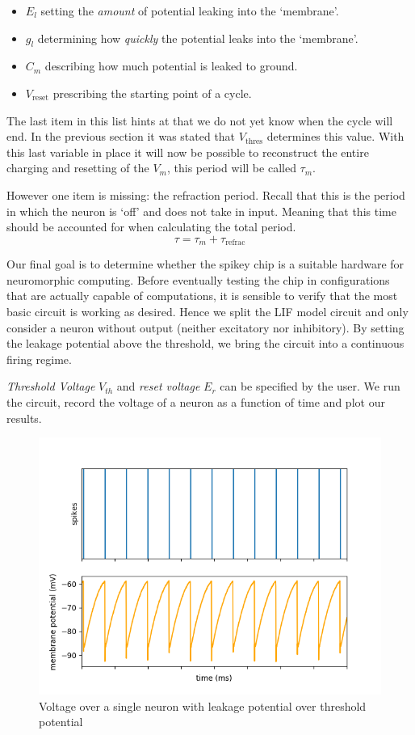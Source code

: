 \documentclass[a4paper,twocolumn]{article}
\begin{document}
\begin{itemize}
    \item $E_l$ setting the \textit{amount} of potential leaking into the `membrane'.
    \item $g_l$ determining how \textit{quickly} the potential leaks into the `membrane'.
    \item $C_m$ describing how much potential is leaked to ground.
    \item $V_\text{reset}$ prescribing the starting point of a cycle.
\end{itemize}

The last item in this list hints at that we do not yet know when the cycle will
end. In the previous section it was stated that $V_\text{thres}$ determines
this value. With this last variable in place it will now be possible to
reconstruct the entire charging and resetting of the $V_m$, this period will be
called $\tau_m$.

However one item is missing: the refraction period. Recall that this is the
period in which the neuron is `off' and does not take in input. Meaning that
this time should be accounted for when calculating the total period.
\begin{equation}
    \tau = \tau_m + \tau_\text{refrac}
    \label{eq:tau}
\end{equation}

Our final goal is to determine whether the spikey chip is a suitable hardware for
neuromorphic computing.  Before eventually testing the chip in configurations
that are actually capable of computations,  it is sensible to verify that the
most basic circuit is working as desired.  Hence we split the LIF model circuit
and only consider a neuron without output (neither excitatory nor inhibitory).
By setting the leakage potential above the threshold, we bring the circuit into
a continuous firing regime. \par
\textit{Threshold Voltage} $V_{th}$ and \textit{reset voltage} $E_r$ can be
specified by the user.  We run the circuit,  record the voltage of a neuron as
a function of time and plot our results.

\begin{figure}[ht]
    \centering
    \includegraphics[width=.5\textwidth]{figures/fp_task1_1membrane.png}
    \caption{Voltage over a single neuron with leakage potential over threshold potential}
    \label{fig:membranes_ex1}
\end{figure}
\end{document}
